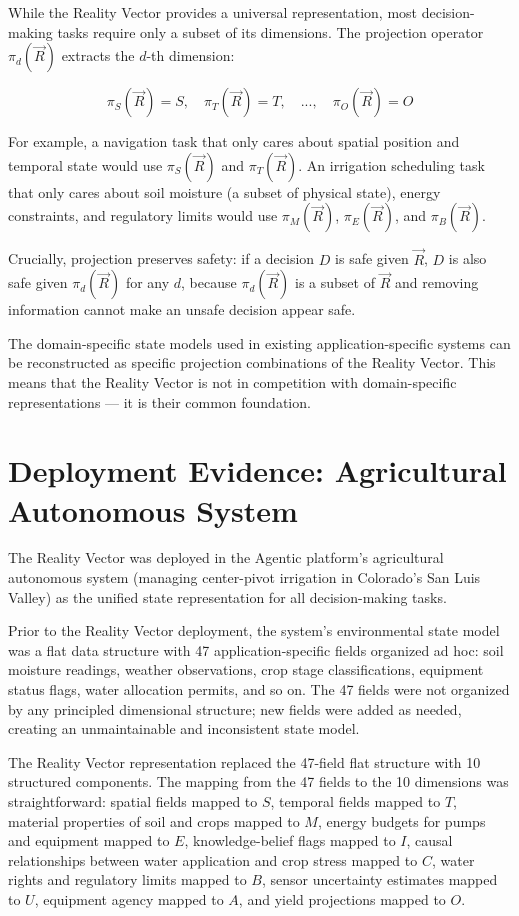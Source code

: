 \documentclass[12pt]{article}
\begin{document}
While the Reality Vector provides a universal representation, most decision-making tasks require only a subset of its dimensions. The projection operator $\pi_d(\vec{R})$ extracts the $d$-th dimension:

$$\pi_S(\vec{R}) = S, \quad \pi_T(\vec{R}) = T, \quad ..., \quad \pi_O(\vec{R}) = O$$

For example, a navigation task that only cares about spatial position and temporal state would use $\pi_S(\vec{R})$ and $\pi_T(\vec{R})$. An irrigation scheduling task that only cares about soil moisture (a subset of physical state), energy constraints, and regulatory limits would use $\pi_M(\vec{R})$, $\pi_E(\vec{R})$, and $\pi_B(\vec{R})$.

Crucially, projection preserves safety: if a decision $D$ is safe given $\vec{R}$, $D$ is also safe given $\pi_d(\vec{R})$ for any $d$, because $\pi_d(\vec{R})$ is a subset of $\vec{R}$ and removing information cannot make an unsafe decision appear safe.

The domain-specific state models used in existing application-specific systems can be reconstructed as specific projection combinations of the Reality Vector. This means that the Reality Vector is not in competition with domain-specific representations --- it is their common foundation.

\section{Deployment Evidence: Agricultural Autonomous System}
\label{sec:deployment}

The Reality Vector was deployed in the Agentic platform's agricultural autonomous system (managing center-pivot irrigation in Colorado's San Luis Valley) as the unified state representation for all decision-making tasks.

Prior to the Reality Vector deployment, the system's environmental state model was a flat data structure with 47 application-specific fields organized ad hoc: soil moisture readings, weather observations, crop stage classifications, equipment status flags, water allocation permits, and so on. The 47 fields were not organized by any principled dimensional structure; new fields were added as needed, creating an unmaintainable and inconsistent state model.

The Reality Vector representation replaced the 47-field flat structure with 10 structured components. The mapping from the 47 fields to the 10 dimensions was straightforward: spatial fields mapped to $S$, temporal fields mapped to $T$, material properties of soil and crops mapped to $M$, energy budgets for pumps and equipment mapped to $E$, knowledge-belief flags mapped to $I$, causal relationships between water application and crop stress mapped to $C$, water rights and regulatory limits mapped to $B$, sensor uncertainty estimates mapped to $U$, equipment agency mapped to $A$, and yield projections mapped to $O$.
\end{document}
